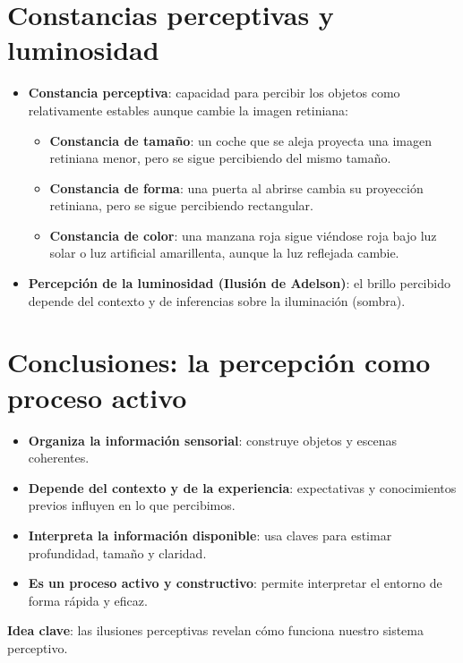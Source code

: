 \documentclass[11pt,a4paper]{article}
\begin{document}
\section{Constancias perceptivas y luminosidad}

\begin{itemize}
  \item \textbf{Constancia perceptiva}: capacidad para percibir los objetos como relativamente estables aunque cambie la imagen retiniana:
  \begin{itemize}
    \item \textbf{Constancia de tamaño}: un coche que se aleja proyecta una imagen retiniana menor, pero se sigue percibiendo del mismo tamaño.
    \item \textbf{Constancia de forma}: una puerta al abrirse cambia su proyección retiniana, pero se sigue percibiendo rectangular.
    \item \textbf{Constancia de color}: una manzana roja sigue viéndose roja bajo luz solar o luz artificial amarillenta, aunque la luz reflejada cambie.
  \end{itemize}
  \item \textbf{Percepción de la luminosidad (Ilusión de Adelson)}: el brillo percibido depende del contexto y de inferencias sobre la iluminación (sombra).
\end{itemize}

\section{Conclusiones: la percepción como proceso activo}

\begin{cajaIdea}[title={La percepción no es una copia pasiva de la realidad}]
\begin{itemize}
  \item \textbf{Organiza la información sensorial}: construye objetos y escenas coherentes.
  \item \textbf{Depende del contexto y de la experiencia}: expectativas y conocimientos previos influyen en lo que percibimos.
  \item \textbf{Interpreta la información disponible}: usa claves para estimar profundidad, tamaño y claridad.
  \item \textbf{Es un proceso activo y constructivo}: permite interpretar el entorno de forma rápida y eficaz.
\end{itemize}
\vspace{0.25em}
\textbf{Idea clave}: las ilusiones perceptivas revelan cómo funciona nuestro sistema perceptivo.
\end{cajaIdea}
\end{document}
